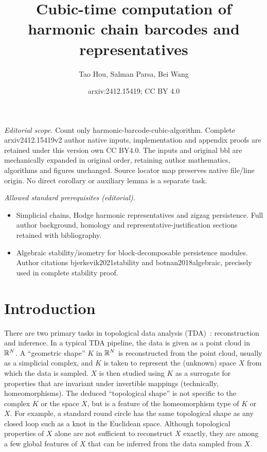 \documentclass[10pt,a4paper]{amsart}
\title{Cubic-time computation of harmonic chain barcodes and representatives}
\author{Tao Hou, Salman Parsa, Bei Wang}
\date{arxiv:2412.15419; CC BY 4.0}
\newcommand {\mm}[1] {\ifmmode{#1}\else{\mbox{\(#1\)}}\fi}
\newcommand{\Rspace}        {\mm{\mathbb{R}}}
\theoremstyle{definition}
\theoremstyle{remark}
\begin{document}
\maketitle
\noindent\textit{Editorial scope.} Count only harmonic-barcode-cubic-algorithm. Complete arxiv2412.15419v2 author native inputs, implementation and appendix proofs are retained under this version own CC BY4.0. The inputs and original bbl are mechanically expanded in original order, retaining author mathematics, algorithms and figures unchanged. Source locator map preserves native file/line origin. No direct corollary or auxiliary lemma is a separate task.\par\medskip
\noindent\textit{Allowed standard prerequisites (editorial).}\begin{itemize}
\item Simplicial chains, Hodge harmonic representatives and zigzag persistence. Full author background, homology and representative-justification sections retained with bibliography.
\item Algebraic stability/isometry for block-decomposable persistence modules. Author citations bjerkevik2021stability and botnan2018algebraic, precisely used in complete stability proof.
\end{itemize}\medskip
\section{Introduction}
\label{sec:introduction}

There are two primary tasks in topological data analysis (TDA)~\cite{DeyWang2022,EdelsbrunnerHarer2010,Zomorodian2005}: reconstruction and inference. 
In a typical TDA pipeline, the data is given as a point cloud in $\Rspace^N$.  
A ``geometric shape'' $K$ in $\Rspace^N$ is reconstructed from the point cloud, usually as a simplicial complex, and $K$ is taken to represent the (unknown) space $X$ from which the data is sampled. 
$X$ is then studied using $K$ as a surrogate for properties that are invariant under invertible mappings (technically, homeomorphisms). 
The deduced ``topological shape'' is not specific to the complex $K$ or the space $X$, but is a feature of the homeomorphism type of $K$ or $X$. 
For example, a standard round circle has the same topological shape as any closed loop such as a knot in the Euclidean space. 
Although topological properties of $X$ alone are not sufficient to reconstruct $X$ exactly, they are among a few global features of $X$ that can be inferred from the data sampled from $X$. 
\end{document}
